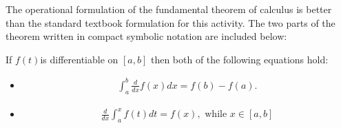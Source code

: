 \documentclass{ximera}
\begin{document}
The operational formulation of the fundamental theorem of calculus is better than the standard textbook formulation for this activity. The two parts of the theorem written in compact symbolic notation are included below:

If $f(t)$is differentiable on $[a,b]$ then both of the following equations hold:

\begin{itemize}
\item \begin{align}
	\int_{a}^b\frac{d}{dx}f(x)dx  = f(b)-f(a). \nonumber\end{align}
\item \begin{align}
	\frac{d}{dx}\int_{a}^x f(t)dt = f(x), \text{ while } x \in [a,b] \nonumber\end{align}
\end{itemize}
\end{document}
